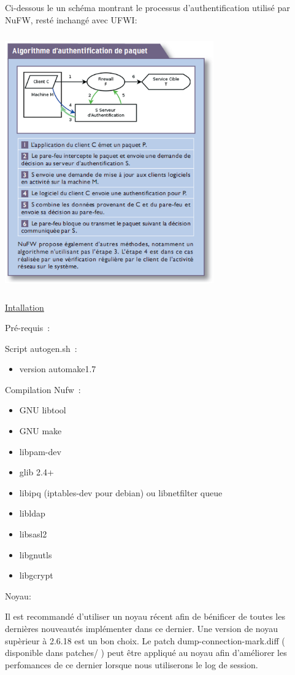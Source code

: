 \documentclass[12pt]{report}
\begin{document}
Ci-dessous le un schéma montrant le processus d'authentification utilisé par NuFW, resté inchangé avec UFWI:

\begin{center}
  \includegraphics[width=9cm,height=11cm]{images/auth.png}
\end{center}

\underline{Intallation}

Pré-requis :

Script autogen.sh :
    \begin{itemize}
      \item version automake1.7
    \end{itemize}
Compilation Nufw :
  \begin{itemize}
    \item GNU libtool
    \item GNU make
    \item libpam-dev
    \item glib 2.4+
    \item libipq (iptables-dev pour debian) ou libnetfilter queue
    \item libldap
    \item libsasl2
    \item libgnutls
    \item libgcrypt
  \end{itemize}

Noyau:

Il est recommandé d'utiliser un noyau récent afin de bénificer de toutes les dernières nouveautés implémenter dans ce dernier.
Une version de noyau supèrieur à 2.6.18 est un bon choix. Le patch dump-connection-mark.diff ( disponible dans patches/ ) 
peut être appliqué au noyau afin d'améliorer les perfomances de ce dernier lorsque nous utiliserons le log de session.
\end{document}
